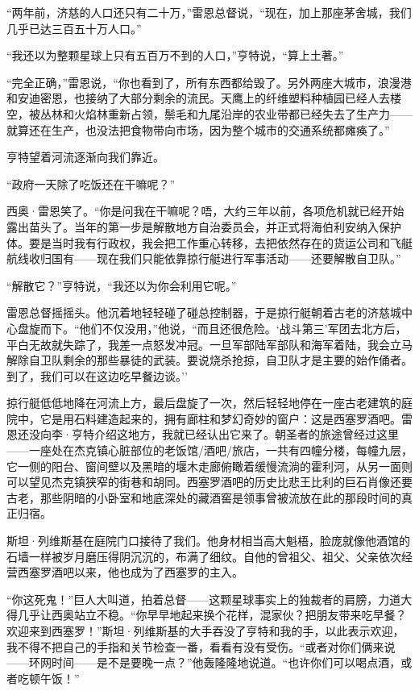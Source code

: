 \documentclass[AutoFakeBold=true]{book}
\begin{document}
``两年前，济慈的人口还只有二十万，''雷恩总督说，``现在，加上那座茅舍城，我们几乎已达三百五十万人口。''

``我还以为整颗星球上只有五百万不到的人口，''亨特说，``算上土著。''

``完全正确，''雷恩说，``你也看到了，所有东西都给毁了。另外两座大城市，浪漫港和安迪密恩，也接纳了大部分剩余的流民。天鹰上的纤维塑料种植园已经人去楼空，被丛林和火焰林重新占领，鬃毛和九尾沿岸的农业带都已经失去了生产力——就算还在生产，也没法把食物带向市场，因为整个城市的交通系统都瘫痪了。''

亨特望着河流逐渐向我们靠近。

``政府一天除了吃饭还在干嘛呢？''

西奥·雷恩笑了。``你是问{\kaishu 我}在干嘛呢？唔，大约三年以前，各项危机就已经开始露出苗头了。当年的第一步是解散地方自治委员会，并正式将海伯利安纳入保护体。要是当时我有行政权，我会把工作重心转移，去把依然存在的货运公司和飞艇航线收归国有——现在我们只能依靠掠行艇进行军事活动——还要解散自卫队。''

``解散它？''亨特说，``我还以为你会利用它呢。''

雷恩总督摇摇头。他沉着地轻轻碰了碰总控制器，于是掠行艇朝着古老的济慈城中心盘旋而下。``他们不仅没用，''他说，``而且还很危险。`战斗第三'军团去北方后，平白无故就失踪了，我差一点怒发冲冠。一旦军部陆军部队和海军着陆，我会立马解除自卫队剩余的那些暴徒的武装。要说烧杀抢掠，自卫队才是主要的始作俑者。到了，我们可以在这边吃早餐边谈。''

掠行艇低低地降在河流上方，最后盘旋了一次，然后轻轻地停在一座古老建筑的庭院中，它是用石料建造起来的，拥有廊柱和梦幻奇妙的窗户：这是西塞罗酒吧。雷恩还没向李·亨特介绍这地方，我就已经认出它来了。朝圣者的旅途曾经过这里——一座处在杰克镇心脏部位的老饭馆/酒吧/旅店，一共有四幢分楼，每幢九层，它一侧的阳台、窗间壁以及黑暗的堰木走廊俯瞰着缓慢流淌的霍利河，从另一面则可以望见杰克镇狭窄的街巷和胡同。西塞罗酒吧的历史比悲王比利的巨石肖像还要古老，那些阴暗的小卧室和地底深处的藏酒窖是领事曾被流放在此的那段时间的真正归宿。

斯坦·列维斯基在庭院门口接待了我们。他身材相当高大魁梧，脸庞就像他酒馆的石墙一样被岁月磨压得阴沉沉的，布满了细纹。自他的曾祖父、祖父、父亲依次经营西塞罗酒吧以来，他也成为了西塞罗的主入。

``你这死鬼！''巨人大叫道，拍着总督——这颗星球事实上的独裁者的肩膀，力道大得几乎让西奥站立不稳。``你早早地起来换个花样，混家伙？把朋友带来吃早餐？欢迎来到西塞罗！''斯坦·列维斯基的大手吞没了亨特和我的手，以此表示欢迎，我不得不把自己的手指和关节检查一番，看看有没有受伤。``或者对你们俩来说——环网时间——是不是要晚一点？''他轰隆隆地说道。``也许你们可以喝点酒，或者吃顿午饭！''
\end{document}
